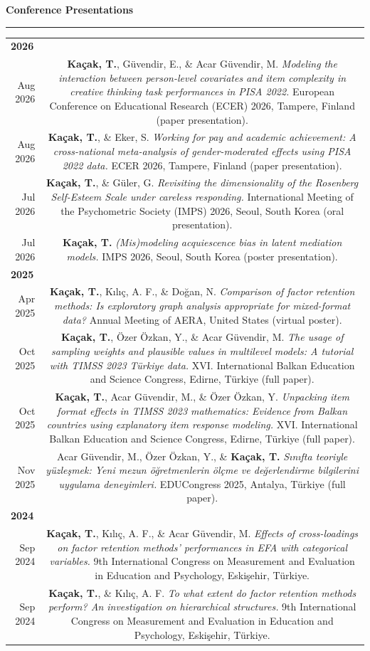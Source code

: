 \documentclass[10pt,a4paper]{article}
\newcommand{\me}[1]{\textbf{\color{headwhite}#1}}
\newcommand{\cvsection}[1]{%
  \vspace{10pt}%
  {\color{headwhite}\large\bfseries #1}\par
  \vspace{2pt}
  {\color{rulegray}\hrule height 0.6pt}
  \vspace{7pt}
}
\newenvironment{cvtable}{%
  \begin{longtable}{D!{\color{rulegray}\vrule width 0.6pt\hspace{4pt}}C}
}{%
  \end{longtable}
}
\newcommand{\cvrow}[2]{#1 & #2 \\[7pt]}
\newcommand{\cvyearhead}[1]{\multicolumn{2}{l}{\rule{0pt}{18pt}\color{headwhite}\bfseries #1}\\[3pt]}
\begin{document}
\cvsection{Conference Presentations}
\begin{cvtable}
\cvyearhead{2026}
\cvrow{Aug 2026}{\me{Kaçak, T.}, G\"uvendir, E., \& Acar G\"uvendir, M. \textit{Modeling the interaction between person-level covariates and item complexity in creative thinking task performances in PISA 2022.} European Conference on Educational Research (ECER) 2026, Tampere, Finland (paper presentation).}
\cvrow{Aug 2026}{\me{Kaçak, T.}, \& Eker, S. \textit{Working for pay and academic achievement: A cross-national meta-analysis of gender-moderated effects using PISA 2022 data.} ECER 2026, Tampere, Finland (paper presentation).}
\cvrow{Jul 2026}{\me{Kaçak, T.}, \& G\"uler, G. \textit{Revisiting the dimensionality of the Rosenberg Self-Esteem Scale under careless responding.} International Meeting of the Psychometric Society (IMPS) 2026, Seoul, South Korea (oral presentation).}
\cvrow{Jul 2026}{\me{Kaçak, T.} \textit{(Mis)modeling acquiescence bias in latent mediation models.} IMPS 2026, Seoul, South Korea (poster presentation).}
\cvyearhead{2025}
\cvrow{Apr 2025}{\me{Kaçak, T.}, Kılıç, A. F., \& Do\u{g}an, N. \textit{Comparison of factor retention methods: Is exploratory graph analysis appropriate for mixed-format data?} Annual Meeting of AERA, United States (virtual poster).}
\cvrow{Oct 2025}{\me{Kaçak, T.}, \"Ozer \"Ozkan, Y., \& Acar G\"uvendir, M. \textit{The usage of sampling weights and plausible values in multilevel models: A tutorial with TIMSS 2023 T\"urkiye data.} XVI. International Balkan Education and Science Congress, Edirne, T\"urkiye (full paper).}
\cvrow{Oct 2025}{\me{Kaçak, T.}, Acar G\"uvendir, M., \& \"Ozer \"Ozkan, Y. \textit{Unpacking item format effects in TIMSS 2023 mathematics: Evidence from Balkan countries using explanatory item response modeling.} XVI. International Balkan Education and Science Congress, Edirne, T\"urkiye (full paper).}
\cvrow{Nov 2025}{Acar G\"uvendir, M., \"Ozer \"Ozkan, Y., \& \me{Kaçak, T.} \textit{Sınıfta teoriyle y\"uzleşmek: Yeni mezun \"o\u{g}retmenlerin \"ol\c{c}me ve de\u{g}erlendirme bilgilerini uygulama deneyimleri.} EDUCongress 2025, Antalya, T\"urkiye (full paper).}
\cvyearhead{2024}
\cvrow{Sep 2024}{\me{Kaçak, T.}, Kılıç, A. F., \& Acar G\"uvendir, M. \textit{Effects of cross-loadings on factor retention methods' performances in EFA with categorical variables.} 9th International Congress on Measurement and Evaluation in Education and Psychology, Eskişehir, T\"urkiye.}
\cvrow{Sep 2024}{\me{Kaçak, T.}, \& Kılıç, A. F. \textit{To what extent do factor retention methods perform? An investigation on hierarchical structures.} 9th International Congress on Measurement and Evaluation in Education and Psychology, Eskişehir, T\"urkiye.}

\end{cvtable}
\end{document}
